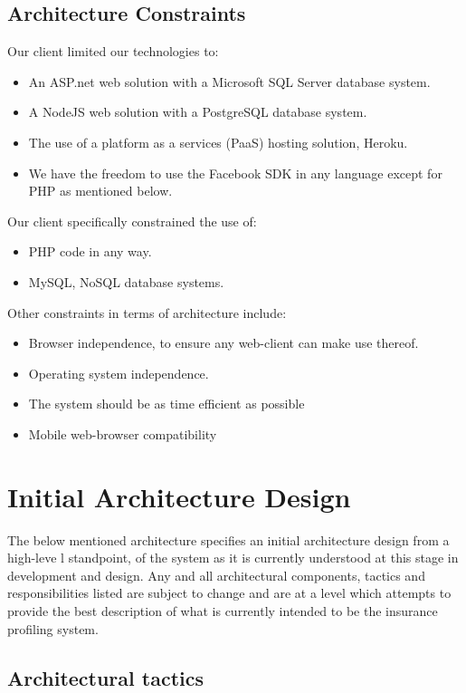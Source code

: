 \documentclass{article}
\begin{document}
	\subsection{Architecture Constraints}
	Our client limited our technologies to:
	\begin{itemize}
		\item An ASP.net web solution with a Microsoft SQL Server database system.
		\item A NodeJS web solution with a PostgreSQL database system.
		\item The use of a platform as a services (PaaS) hosting solution, Heroku.
		\item We have the freedom to use the Facebook SDK in any language except for PHP as mentioned below.
	\end{itemize}
	Our client specifically constrained the use of:
		\begin{itemize}
		\item PHP code in any way.
		\item MySQL, NoSQL database systems.
		\end{itemize}
	Other constraints in terms of architecture include:
	\begin{itemize}
		\item Browser independence, to ensure any web-client can make use thereof.
		\item Operating system independence.
		\item The system should be as time efficient as possible
		\item Mobile web-browser compatibility 
		\end{itemize}
\pagebreak

	\section{Initial Architecture Design}

	The below mentioned architecture specifies an initial architecture design from a high-leve l standpoint, of the system as it is currently understood at this stage in development and design. Any and all architectural components, tactics and responsibilities listed are subject to change and are at a level which attempts to provide the best description of what is currently intended to be the insurance profiling system.

	\subsection{Architectural tactics}\label{subsec:tactics}
\end{document}
